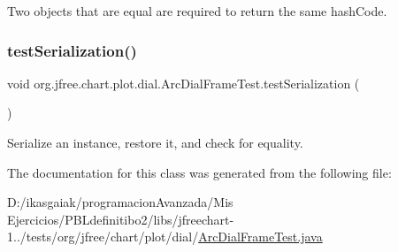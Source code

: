 Two objects that are equal are required to return the same hash\+Code. \mbox{\label{classorg_1_1jfree_1_1chart_1_1plot_1_1dial_1_1_arc_dial_frame_test_a34048893922691997e7a38431738d6fa}} 
\subsubsection{\texorpdfstring{test\+Serialization()}{testSerialization()}}
{\footnotesize\ttfamily void org.\+jfree.\+chart.\+plot.\+dial.\+Arc\+Dial\+Frame\+Test.\+test\+Serialization (\begin{DoxyParamCaption}{ }\end{DoxyParamCaption})}

Serialize an instance, restore it, and check for equality. 

The documentation for this class was generated from the following file\+:\begin{DoxyCompactItemize}
\item 
D\+:/ikasgaiak/programacion\+Avanzada/\+Mis Ejercicios/\+P\+B\+Ldefinitibo2/libs/jfreechart-\/1../tests/org/jfree/chart/plot/dial/\mbox{\hyperlink{_arc_dial_frame_test_8java}{Arc\+Dial\+Frame\+Test.\+java}}\end{DoxyCompactItemize}
